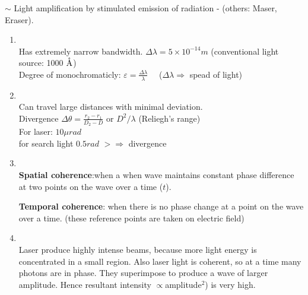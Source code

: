 \documentclass[12pt, a4paper]{article}
\begin{document}
$\sim$ Light amplification by stimulated emission of radiation
- (others: Maser, Eraser).

\begin{enumerate}
	\item {}\\
	      Has extremely narrow bandwidth. $\Delta \lambda=5 \times 10^{-14} \unit{m}$ (conventional light source: 1000 $\mathring{\textrm{A}}$)\\
	      Degree of monochromaticly: $\varepsilon=\frac{\Delta\lambda}{\lambda}$ \ \ ($\Delta\lambda \Rightarrow$ spead of light)
	\item {}\\
	      Can travel large distances with minimal deviation.\\
	      Divergence $\Delta \theta=\frac{r_2-r_1}{D_2-D}$ or $D^2 / \lambda$ (Reliegh's range) \\
	      For laser: $10 \mu\unit{rad}$\\
	      for search light $0.5rad$
	      $>\Rightarrow$ divergence
	\item {}\\
	      \textbf{Spatial coherence}:when a when wave maintains constant phase difference at two points on the wave over a time ($t$).

	      \textbf{Temporal coherence}: when there is no phase change at a point on the wave over a time. (these reference points are taken on electric field)
	\item {}\\
	      Laser produce highly intense beams, because more light energy is concentrated in a small region. Also laser light is coherent, so at a time many photons are in phase. They superimpose to produce a wave of larger amplitude. Hence resultant intensity  $\propto$amplitude$^2$) is very high.
\end{enumerate}

\noparindent
\begin{framed}
\end{framed}
\end{document}
